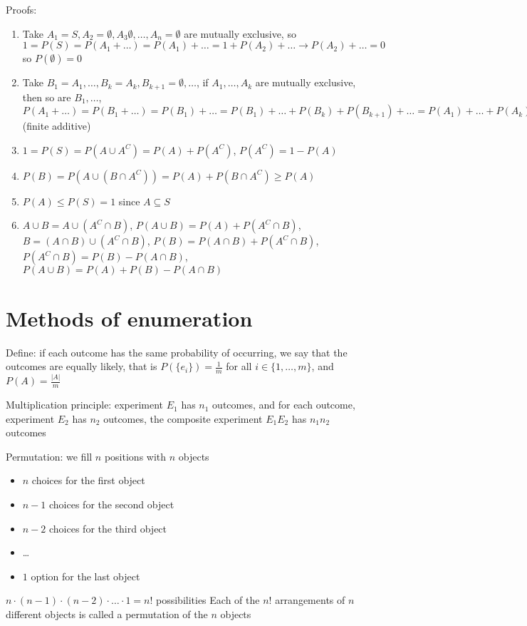 \documentclass{article}
\begin{document}
Proofs:
\begin{enumerate}
    \item Take $A_1=S,A_2=\emptyset,A_3\emptyset,\dots,A_n=\emptyset$ are mutually exclusive, so $1=P(S)=P(A_1+\dots)=P(A_1)+\dots=1+P(A_2)+\dots\rightarrow P(A_2)+\dots=0$ so $P(\emptyset)=0$
    \item Take $B_1=A_1,\dots,B_k=A_k,B_{k+1}=\emptyset,\dots$, if $A_1,\dots,A_k$ are mutually exclusive, then so are $B_1,\dots$, $P(A_1+\dots)=P(B_1+\dots)=P(B_1)+\dots=P(B_1)+\dots+P(B_k)+P(B_{k+1})+\dots=P(A_1)+\dots+P(A_k)$ (finite additive)
    \item $1=P(S)=P(A\cup A^C)=P(A)+P(A^C)$, $P(A^C)=1-P(A)$
    \item $P(B)=P(A\cup(B\cap A^C))=P(A)+P(B\cap A^C)\ge P(A)$
    \item $P(A)\le P(S)=1$ since $A\subseteq S$
    \item $A\cup B=A\cup(A^C\cap B)$, $P(A\cup B)=P(A)+P(A^C\cap B)$, $B=(A\cap B)\cup(A^C\cap B)$, $P(B)=P(A\cap B)+P(A^C\cap B)$, $P(A^C\cap B)=P(B)-P(A\cap B)$, $P(A\cup B)=P(A)+P(B)-P(A\cap B)$
\end{enumerate}

\section{Methods of enumeration}

Define: if each outcome has the same probability of occurring, we say that the outcomes are equally likely, that is $P(\{e_i\})=\frac{1}{m}$ for all $i\in\{1,\dots,m\}$, and $P(A)=\frac{\lvert A\rvert}{m}$

Multiplication principle: experiment $E_1$ has $n_1$ outcomes, and for each outcome, experiment $E_2$ has $n_2$ outcomes, the composite experiment $E_1E_2$ has $n_1n_2$ outcomes

Permutation: we fill $n$ positions with $n$ objects
\begin{itemize}
    \item $n$ choices for the first object
    \item $n-1$ choices for the second object
    \item $n-2$ choices for the third object
    \item \dots
    \item $1$ option for the last object
\end{itemize}
$n\cdot(n-1)\cdot(n-2)\cdot\dots\cdot1=n!$ possibilities
Each of the $n!$ arrangements of $n$ different objects is called a permutation of the $n$ objects
\end{document}
